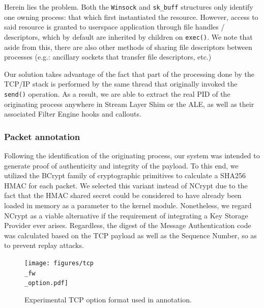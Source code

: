 Herein lies the problem. Both the \texttt{Winsock} and \texttt{sk\_buff} structures only identify one owning process: that which first instantiated the resource. However, access to said resource is granted to userspace application through file handles / descriptors, which by default are inherited by children on \texttt{exec()}. We note that aside from this, there are also other methods of sharing file descriptors between processes (e.g.: ancillary sockets that transfer file descriptors, etc.)

Our solution takes advantage of the fact that part of the processing done by the TCP/IP stack is performed by the same thread that originally invoked the \texttt{send()} operation. As a result, we are able to extract the real PID of the originating process anywhere in Stream Layer Shim or the ALE, as well as their associated Filter Engine hooks and callouts.


\subsubsection{Packet annotation}
\label{sign:windows:implementation:annotation}

Following the identification of the originating process, our system was intended to generate proof of authenticity and integrity of the payload. To this end, we utilized the BCrypt family of cryptographic primitives to calculate a SHA256 HMAC for each packet. We selected this variant instead of NCrypt due to the fact that the HMAC shared secret could be considered to have already been loaded in memory as a parameter to the kernel module. Nonetheless, we regard NCrypt as a viable alternative if the requirement of integrating a Key Storage Provider ever arises. Regardless, the digest of the Message Authentication code was calculated based on the TCP payload as well as the Sequence Number, so as to prevent replay attacks.

\begin{figure}
    \centering
    \texttt{[image: figures/tcp\\\_fw\\\_option.pdf]}
    \caption{Experimental TCP option format used in annotation.}
    \label{sign:windows:fig:tcp-fw-option}
\end{figure}

